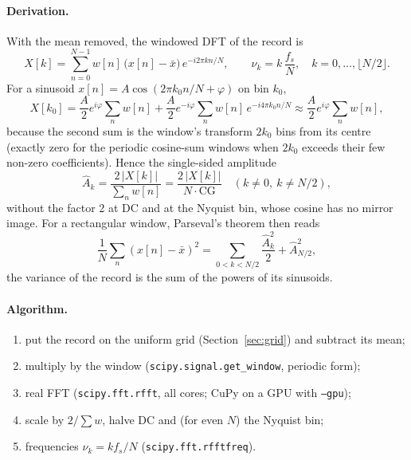 \documentclass[10pt,letterpaper]{article}
\numberwithin{equation}{section}
\begin{document}
\paragraph{Derivation.} With the mean removed, the windowed DFT of the record is \cite{B39}
\begin{equation}
X[k] = \sum_{n=0}^{N-1} w[n]\,\big(x[n]-\bar{x}\big)\,e^{-i2\pi kn/N},
\qquad \nu_k = k\,\frac{f_s}{N},\quad k = 0,\dots,\lfloor N/2\rfloor.
\end{equation}
For a sinusoid $x[n] = A\cos(2\pi k_0 n/N + \varphi)$ on bin $k_0$,
\begin{equation}
X[k_0] = \frac{A}{2}e^{i\varphi}\sum_n w[n] + \frac{A}{2}e^{-i\varphi}\sum_n w[n]\,e^{-i4\pi k_0 n/N}
\approx \frac{A}{2}e^{i\varphi}\sum_n w[n],
\end{equation}
because the second sum is the window's transform $2k_0$ bins from its centre
(exactly zero for the periodic cosine-sum windows when $2k_0$ exceeds their
few non-zero coefficients). Hence the single-sided amplitude
\begin{equation}
\hat{A}_k = \frac{2\,|X[k]|}{\sum_n w[n]} = \frac{2\,|X[k]|}{N\cdot\mathrm{CG}}\quad(k \ne 0,\ k\ne N/2),
\label{eq:amplitude}
\end{equation}
without the factor 2 at DC and at the Nyquist bin, whose cosine has no mirror
image. For a rectangular window, Parseval's theorem then reads
\begin{equation}
\frac{1}{N}\sum_n (x[n]-\bar{x})^2 = \sum_{0<k<N/2}\frac{\hat{A}_k^2}{2} + \hat{A}_{N/2}^2,
\end{equation}
the variance of the record is the sum of the powers of its sinusoids.

\paragraph{Algorithm.}
\begin{enumerate}
\item put the record on the uniform grid (Section~\ref{sec:grid}) and subtract its mean;
\item multiply by the window (\texttt{scipy.signal.get\_window}, periodic form);
\item real FFT (\texttt{scipy.fft.rfft}, all cores; CuPy on a GPU with \texttt{--gpu});
\item scale by $2/\sum w$, halve DC and (for even $N$) the Nyquist bin;
\item frequencies $\nu_k = k f_s/N$ (\texttt{scipy.fft.rfftfreq}).
\end{enumerate}
\end{document}

